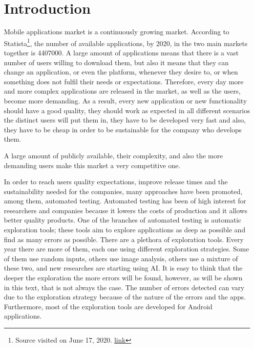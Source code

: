 
\chapter{Introduction} %

\label{Chapter1} %

Mobile applications market is a continuously growing market. According to Statista\footnote{Source visited on June 17, 2020. \href{https://www.statista.com/statistics/276623/number-of-apps-available-in-leading-app-stores/\#:~:text=As\%20of\%20the\%20first\%20quarter,million\%20available\%20apps\%20for\%20iOS.}{link}}, the number of available applications, by 2020, in the two main markets together is 4407000. A large amount of applications means that there is a vast number of users willing to download them, but also it means that they can change an application, or even the platform, whenever they desire to, or when something does not fulfil their needs or expectations. Therefore, every day more and more complex applications are released in the market, as well as the users, become more demanding. As a result, every new application or new functionality should have a good quality, they should work as expected in all different scenarios the distinct users will put them in, they have to be developed very fast and also, they have to be cheap in order to be sustainable for the company who develops them.

A large amount of publicly available, their complexity, and also the more demanding users make this market a very competitive one.

In order to reach users quality expectations, improve release times and the sustainability needed for the companies, many approaches have been promoted, among them, automated testing. Automated testing has been of high interest for researchers and companies because it lowers the costs of production and it allows better quality products. One of the branches of automated testing is automatic exploration tools; these tools aim to explore applications as deep as possible and find as many errors as possible. There are a plethora of exploration tools. Every year there are more of them, each one using different exploration strategies. Some of them use random inputs, others use image analysis, others use a mixture of these two, and new researches are starting using AI. It is easy to think that the deeper the exploration the more errors will be found, however, as will be shown in this text, that is not always the case. The number of errors detected can vary due to the exploration strategy because of the nature of the errors and the apps. Furthermore, most of the exploration tools are developed for Android applications.

